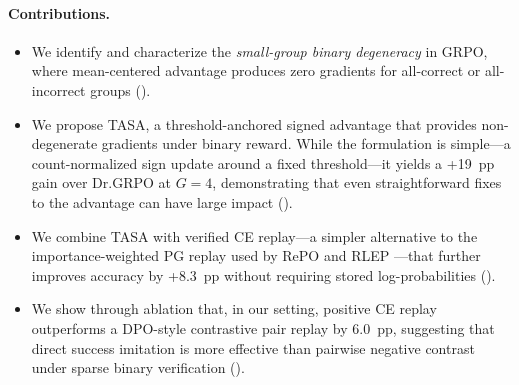 \paragraph{Contributions.}
\begin{itemize}[leftmargin=*,topsep=2pt,itemsep=1pt]
\item We identify and characterize the \emph{small-group binary degeneracy} in GRPO, where mean-centered advantage produces zero gradients for all-correct or all-incorrect groups ().
\item We propose TASA, a threshold-anchored signed advantage that provides non-degenerate gradients under binary reward. While the formulation is simple---a count-normalized sign update around a fixed threshold---it yields a +19~pp gain over Dr.GRPO at $G{=}4$, demonstrating that even straightforward fixes to the advantage can have large impact ().
\item We combine TASA with verified CE replay---a simpler alternative to the importance-weighted PG replay used by RePO \citep{li2025repo} and RLEP \citep{zhang2025rlep}---that further improves accuracy by +8.3~pp without requiring stored log-probabilities ().
\item We show through ablation that, in our setting, positive CE replay outperforms a DPO-style contrastive pair replay by 6.0~pp, suggesting that direct success imitation is more effective than pairwise negative contrast under sparse binary verification ().
\end{itemize}
